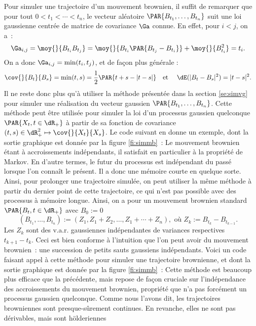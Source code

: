 Pour simuler une trajectoire d'un mouvement brownien, il suffit de remarquer
que pour tout $0<t_1<\cdots<t_n$, le vecteur aléatoire
$\PAR{B_{t_1},\ldots,B_{t_n}}$ suit une loi gaussienne centrée de matrice de
covariance $\Ga$ connue. En effet, pour $i<j$, on a~:
$$
\Ga_{i,j}
=\moy{}{B_{t_i}B_{t_j}}
=\moy{}{B_{t_i}\PAR{B_{t_j}-B_{t_i}}}+\moy{}{B_{t_i}^2}=t_i.
$$
On a donc $\Ga_{i,j}=\min(t_i,t_j)$, et de façon plus générale :
$$
\cov{}{B_t}{B_s}=\min(t,s)=\frac{1}{2}\PAR{t+s-|t-s|}
\text{\quad et \quad} 
\dE(|B_t-B_s|^2)=|t-s|^2.
$$
Il ne reste donc plus qu'à utiliser la méthode présentée dans la section
\ref{se:simvg} pour simuler une réalisation du vecteur gaussien
$\PAR{B_{t_1},\ldots,B_{t_n}}$.  Cette méthode peut être utilisée pour simuler
la loi d'un processus gaussien quelconque $\PAR{X_t,t\in\dR_+}$ à partir de sa
fonction de covariance $(t,s)\in\dR_+^2\mapsto\cov{}{X_t}{X_s}$. Le code \ML{}
suivant en donne un exemple, dont la sortie graphique est donnée par la figure
\ref{fi:simmb}~:
%
%
%
Le mouvement brownien étant à accroissements indépendants, il satisfait en
particulier à la propriété de Markov. En d'autre termes, le futur du processus
est indépendant du passé lorsque l'on connaît le présent. Il a donc une
mémoire courte en quelque sorte. Ainsi, pour prolonger une trajectoire
simulée, on peut utiliser la même méthode à partir du dernier point de cette
trajectoire, ce qui n'est pas possible avec des processus à mémoire longue.
Ainsi, on a pour un mouvement brownien standard $\PAR{B_t,t\in\dR_+}$ avec
$B_0:=0$
$$
(B_{t_1},\ldots,B_{t_n}):=(Z_1,Z_1+Z_2,\ldots,Z_1+\cdots+Z_n), \text{ où }
Z_k:=B_{t_k}-B_{t_{k-1}}.
$$
Les $Z_k$ sont des v.a.r. gaussiennes indépendantes de variances
respectives $t_{k+1}-t_k$.  Ceci est bien conforme à l'intuition que l'on peut
avoir du mouvement brownien~: une succession de petits sauts gaussiens
indépendants. Voici un code \ML{} faisant appel à cette méthode pour simuler
une trajectoire brownienne, et dont la sortie graphique est donnée par la
figure \ref{fi:simmb}~:
%
%
Cette méthode est beaucoup plus efficace que la précédente, mais repose de
façon cruciale sur l'indépendance des accroissements du mouvement brownien,
propriété que n'a pas forcément un processus gaussien quelconque.
%
%  
Comme nous l'avons dit, les trajectoires browniennes sont presque-sûrement
continues. En revanche, elles ne sont pas dérivables, mais sont hölderiennes
